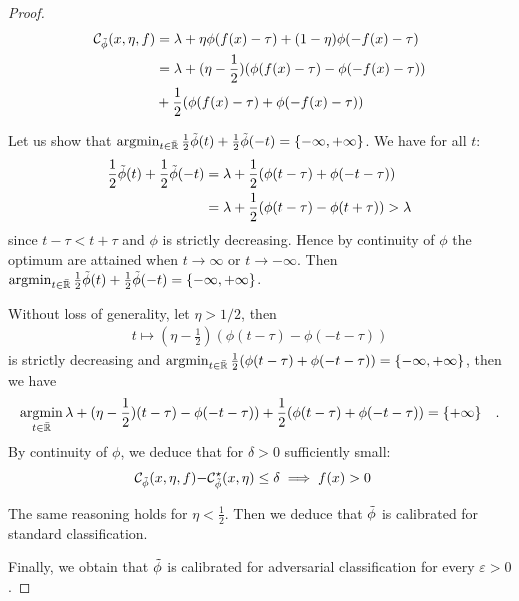 \begin{proof}
    \begin{align*}
         \mathcal{C}_{\Tilde{\phi}}(x,\eta,f) &= \lambda + \eta\phi(f(x)-\tau) + (1-\eta)\phi(-f(x)-\tau)\\
         &= \lambda + (\eta-\frac12)\left(\phi(f(x)-\tau)-\phi(-f(x)-\tau)\right)\\
         &+\frac12 \left(\phi(f(x)-\tau)+\phi(-f(x)-\tau)\right)
    \end{align*}
    
    
    Let us  show that $\operatorname*{argmin}_{t\in\bar{\mathbb{R}}}\frac12\Tilde{\phi}(t)+\frac12 \Tilde{\phi}(-t) = \{-\infty,+\infty\}$. We have for all $t$:
    \begin{align*}
        \frac12\Tilde{\phi}(t)+\frac12\Tilde{\phi}(-t) &= \lambda +\frac12 \left(\phi(t-\tau)+\phi(-t-\tau)\right)\\
        & = \lambda +\frac12 \left(\phi(t-\tau)-\phi(t+\tau)\right)>\lambda
    \end{align*}
    since $t-\tau< t+\tau$ and $\phi$ is strictly decreasing. Hence by continuity of $\phi$ the optimum are attained when $t\to\infty$ or $t\to-\infty$. Then $\operatorname*{argmin}_{t\in\bar{\mathbb{R}}}\frac12\Tilde{\phi}(t)+\frac12 \Tilde{\phi}(-t) = \{-\infty,+\infty\}$.
    
    Without loss of generality, let $\eta>1/2$, then
    \begin{align*}
        t\mapsto  (\eta-\frac12)\left(\phi(t-\tau)-\phi(-t-\tau)\right)
    \end{align*}
    is strictly decreasing and 
        $\argminB_{t\in\bar{\RR}}\frac12 \left(\phi(t-\tau)+\phi(-t-\tau)\right) = \{-\infty,+\infty\}$, then we have 
    \begin{align*}
        \argminB_{t\in\bar{\RR}} \lambda + (\eta-\frac12)\left(t-\tau)-\phi(-t-\tau)\right)+\frac12 \left(\phi(t-\tau)+\phi(-t-\tau)\right) = \{+\infty\}\quad.
    \end{align*}
     By continuity of $\phi$, we deduce that for $\delta>0$ sufficiently small:
    \begin{align*}
        \mathcal{C}_{\Tilde{\phi}}(x,\eta,f)-&\mathcal{C}^\star_{\Tilde{\phi}}(x,\eta)\leq\delta\implies f(x)>0
    \end{align*}
    
    The same reasoning holds for $\eta<\frac12$. Then we deduce that $\Tilde{\phi}$ is calibrated for standard classification.
    
    \medskip
    
    Finally, we obtain that  $\Tilde{\phi}$ is calibrated for adversarial classification for every $\varepsilon>0$.
\end{proof}




